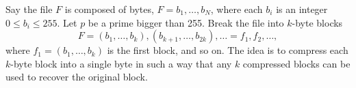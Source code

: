 \documentclass[12pt]{article}
\newcommand{\integers}{\mathbb{Z}}
\begin{document}

Say the file $F$ is composed of bytes, $F = b_1, \ldots, b_N$, where each $b_i$ is an integer $0\leq b_i\leq 255$. Let $p$ be a prime bigger than 255. Break the file into $k$-byte blocks
\[
F = (b_1, \ldots, b_k), (b_{k+1}, \ldots, b_{2k}), \ldots = f_1, f_2, \ldots,
\]
where $f_1 = (b_1, \ldots, b_k)$ is the first block, and so on. The idea is to compress each $k$-byte block into a single byte in such a way that any $k$ compressed blocks can be used to recover the original block.\\
\end{document}
